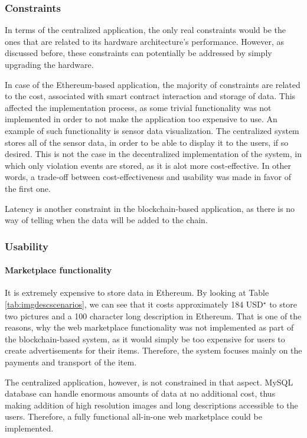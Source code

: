 \subsubsection{Constraints}
In terms of the centralized application, the only real constraints would be the ones that are related to its hardware architecture's performance. However, as discussed before, these constraints can potentially be addressed by simply upgrading the hardware.

In case of the Ethereum-based application, the majority of constraints are related to the cost, associated with smart contract interaction and storage of data. This affected the implementation process, as some trivial functionality was not implemented in order to not make the application too expensive to use. An example of such functionality is sensor data visualization. The centralized system stores all of the sensor data, in order to be able to display it to the users, if so desired. This is not the case in the decentralized implementation of the system, in which only violation events are stored, as it is alot more cost-effective. In other words, a trade-off between cost-effectiveness and usability was made in favor of the first one. 

Latency is another constraint in the blockchain-based application, as there is no way of telling when the data will be added to the chain.

\subsubsection{Usability} \label{section:pracusability}

\paragraph{Marketplace functionality}
It is extremely expensive to store data in Ethereum. By looking at Table \ref{tab:imgdescscenarios}, we can see that it costs approximately 184 USD$^\star$ to store two pictures and a 100 character long description in Ethereum. That is one of the reasons, why the web marketplace functionality was not implemented as part of the blockchain-based system, as it would simply be too expensive for users to create advertisements for their items. Therefore, the system focuses mainly on the payments and transport of the item.

The centralized application, however, is not constrained in that aspect. MySQL database can handle enormous amounts of data at no additional cost, thus making addition of high resolution images and long descriptions accessible to the users. Therefore, a fully functional all-in-one web marketplace could be implemented.

